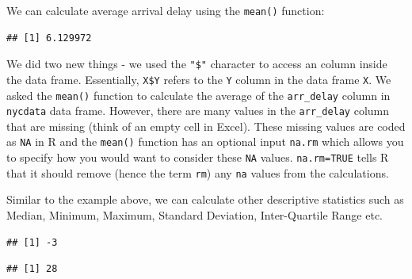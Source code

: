 \documentclass[10pt, letterpaper, twoside]{memoir}\usepackage{knitr}
\begin{document}
We can calculate average arrival delay using the \texttt{mean()}  function:

\begin{knitrout}
\color{fgcolor}\begin{kframe}
\begin{alltt}
\hlopt{$}  \hlstd{=} \hlstd{)}
\end{alltt}
\begin{verbatim}
## [1] 6.129972
\end{verbatim}
\end{kframe}
\end{knitrout}

We did two new things - we used the \verb|"$"| character to access an column inside the data frame. Essentially, \verb|X$Y| refers to the \texttt{Y} column in the data frame \texttt{X}. We asked the \texttt{mean()} function to calculate the average of the \verb|arr_delay| column in \texttt{nycdata} data frame. However, there are many values in the \verb|arr_delay| column that are missing (think of an empty cell in Excel). These missing values are coded as \texttt{NA} in R and the \texttt{mean()} function has an optional input \texttt{na.rm} which allows you to specify how you would want to consider these \texttt{NA} values. \texttt{na.rm=TRUE} tells R that it should remove (hence the term \texttt{rm}) any \texttt{na} values from the calculations.

Similar to the example above, we can calculate other descriptive statistics such as Median, Minimum, Maximum, Standard Deviation, Inter-Quartile Range etc.

\begin{knitrout}
\color{fgcolor}\begin{kframe}
\begin{alltt}
\hlopt{$}  \hlstd{=} \hlstd{)}
\end{alltt}
\begin{verbatim}
## [1] -3
\end{verbatim}
\begin{alltt}
\hlopt{$}  \hlstd{=} \hlstd{)}
\end{alltt}
\begin{verbatim}
## [1] 28
\end{verbatim}
\end{kframe}
\end{knitrout}
\end{document}
